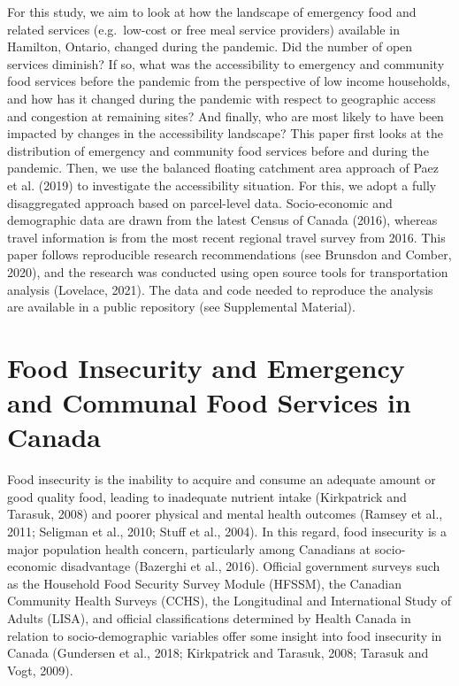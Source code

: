 \documentclass[]{elsarticle} %
\begin{document}
For this study, we aim to look at how the landscape of emergency food
and related services (e.g.~low-cost or free meal service providers)
available in Hamilton, Ontario, changed during the pandemic. Did the
number of open services diminish? If so, what was the accessibility to
emergency and community food services before the pandemic from the
perspective of low income households, and how has it changed during the
pandemic with respect to geographic access and congestion at remaining
sites? And finally, who are most likely to have been impacted by changes
in the accessibility landscape? This paper first looks at the
distribution of emergency and community food services before and during
the pandemic. Then, we use the balanced floating catchment area approach
of Paez et al. (2019) to investigate the accessibility situation. For
this, we adopt a fully disaggregated approach based on parcel-level
data. Socio-economic and demographic data are drawn from the latest
Census of Canada (2016), whereas travel information is from the most
recent regional travel survey from 2016. This paper follows reproducible
research recommendations (see Brunsdon and Comber, 2020), and the
research was conducted using open source tools for transportation
analysis (Lovelace, 2021). The data and code needed to reproduce the
analysis are available in a public repository (see Supplemental
Material).

\hypertarget{food-insecurity-and-emergency-and-communal-food-services-in-canada}{%
\section{Food Insecurity and Emergency and Communal Food Services in
Canada}\label{food-insecurity-and-emergency-and-communal-food-services-in-canada}}

Food insecurity is the inability to acquire and consume an adequate
amount or good quality food, leading to inadequate nutrient intake
(Kirkpatrick and Tarasuk, 2008) and poorer physical and mental health
outcomes (Ramsey et al., 2011; Seligman et al., 2010; Stuff et al.,
2004). In this regard, food insecurity is a major population health
concern, particularly among Canadians at socio-economic disadvantage
(Bazerghi et al., 2016). Official government surveys such as the
Household Food Security Survey Module (HFSSM), the Canadian Community
Health Surveys (CCHS), the Longitudinal and International Study of
Adults (LISA), and official classifications determined by Health Canada
in relation to socio-demographic variables offer some insight into food
insecurity in Canada (Gundersen et al., 2018; Kirkpatrick and Tarasuk,
2008; Tarasuk and Vogt, 2009).
\end{document}
